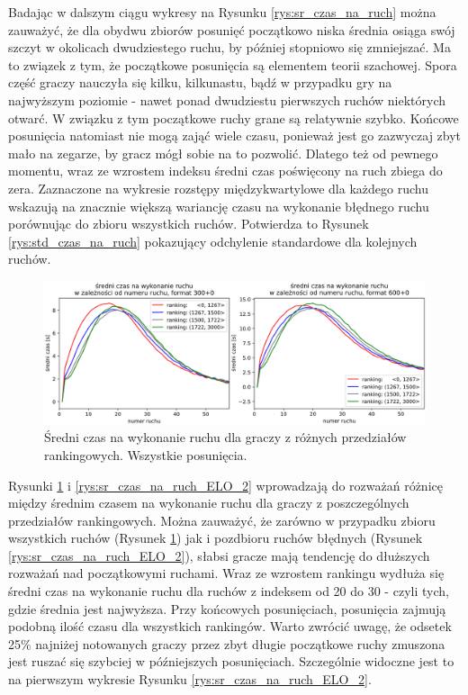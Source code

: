 \documentclass[inzynierska]{pwr_wmat_praca_dyplomowa}
\theoremstyle{plain}
\numberwithin{theorem}{chapter}
\theoremstyle{definition}
\numberwithin{theorem}{chapter}
\begin{document}
Badając w dalszym ciągu wykresy na Rysunku \ref{rys:sr_czas_na_ruch} można zauważyć, że dla obydwu zbiorów posunięć początkowo niska średnia osiąga swój szczyt w okolicach dwudziestego ruchu, by później stopniowo się zmniejszać. Ma to związek z tym, że początkowe posunięcia są elementem teorii szachowej. Spora część graczy nauczyła się kilku, kilkunastu, bądź w przypadku gry na najwyższym poziomie - nawet ponad dwudziestu pierwszych ruchów niektórych otwarć. W związku z tym początkowe ruchy grane są relatywnie szybko. Końcowe posunięcia natomiast nie mogą zająć wiele czasu, ponieważ jest go zazwyczaj zbyt mało na zegarze, by gracz mógł sobie na to pozwolić. Dlatego też od pewnego momentu, wraz ze wzrostem indeksu średni czas poświęcony na ruch zbiega do zera. Zaznaczone na wykresie rozstępy międzykwartylowe dla każdego ruchu wskazują na znacznie większą wariancję czasu na wykonanie błędnego ruchu porównując do zbioru wszystkich ruchów. Potwierdza to Rysunek \ref{rys:std_czas_na_ruch} pokazujący odchylenie standardowe dla kolejnych ruchów. 
\begin{figure}[h]
	\centering
	\includegraphics[width=\textwidth]{sr_czas_na_ruch_ELO_1.png}
	\caption{Średni czas na wykonanie ruchu dla graczy z różnych przedziałów rankingowych. Wszystkie posunięcia.}
	\label{rys:sr_czas_na_ruch_ELO_1}
\end{figure}

Rysunki \ref{rys:sr_czas_na_ruch_ELO_1} i \ref{rys:sr_czas_na_ruch_ELO_2} wprowadzają do rozważań różnicę między średnim czasem na wykonanie ruchu dla graczy z poszczególnych przedziałów rankingowych. Można zauważyć, że zarówno w przypadku zbioru wszystkich ruchów (Rysunek \ref{rys:sr_czas_na_ruch_ELO_1}) jak i pozdbioru ruchów błędnych (Rysunek \ref{rys:sr_czas_na_ruch_ELO_2}), słabsi gracze mają tendencję do dłuższych rozważań nad początkowymi ruchami. Wraz ze wzrostem rankingu wydłuża się średni czas na wykonanie ruchu dla ruchów z indeksem od 20 do 30 - czyli tych, gdzie średnia jest najwyższa. Przy końcowych posunięciach, posunięcia zajmują podobną ilość czasu dla wszystkich rankingów. Warto zwrócić uwagę, że odsetek 25\% najniżej notowanych graczy przez zbyt długie początkowe ruchy zmuszona jest ruszać się szybciej w późniejszych posunięciach. Szczególnie widoczne jest to na pierwszym wykresie Rysunku \ref{rys:sr_czas_na_ruch_ELO_2}. 
\end{document}
